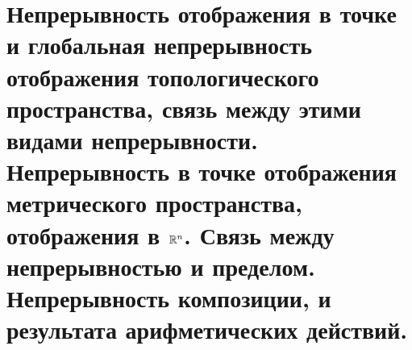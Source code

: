 \documentclass[../main.tex]{subfiles}
\begin{document}
\newpage
\section{Непрерывность отображения в точке и глобальная непрерывность отображения топологического пространства, связь между этими видами непрерывности. Непрерывность в точке отображения метрического пространства, отображения в \( \mathbb{R} ^n\). Связь между непрерывностью и пределом. Непрерывность композиции, и результата арифметических действий.}
\end{document}
